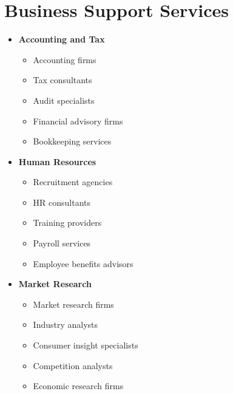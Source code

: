 \section{Business Support Services}\label{sec:business-support}
\vspace{1em}

\begin{tcolorbox}[
    colback=white,
    colframe=primarydark,
    title=\textbf{Business Support Providers},
    before skip=1em,
    after skip=1em
]
    \begin{itemize}[leftmargin=*,itemsep=0.5em]
        \item \textbf{Accounting and Tax}
        \begin{itemize}[itemsep=0.3em]
            \item Accounting firms
            \item Tax consultants
            \item Audit specialists
            \item Financial advisory firms
            \item Bookkeeping services
        \end{itemize}

        \vspace{0.5em}

        \item \textbf{Human Resources}
        \begin{itemize}[itemsep=0.3em]
            \item Recruitment agencies
            \item HR consultants
            \item Training providers
            \item Payroll services
            \item Employee benefits advisors
        \end{itemize}

        \vspace{0.5em}

        \item \textbf{Market Research}
        \begin{itemize}[itemsep=0.3em]
            \item Market research firms
            \item Industry analysts
            \item Consumer insight specialists
            \item Competition analysts
            \item Economic research firms
        \end{itemize}
    \end{itemize}
\end{tcolorbox}

